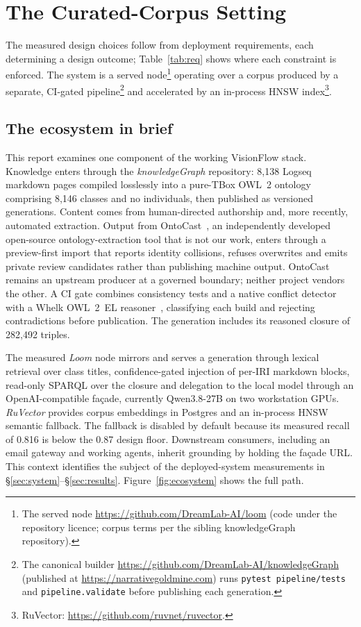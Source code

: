 \documentclass[10pt,twocolumn]{article}
\begin{document}
\section{The Curated-Corpus Setting}\label{sec:setting}
The measured design choices follow from deployment requirements, each determining a design outcome; Table~\ref{tab:req} shows where each constraint is enforced. The system is a served node\footnote{The served node \url{https://github.com/DreamLab-AI/loom} (code under the repository licence; corpus terms per the sibling knowledgeGraph repository).} operating over a corpus produced by a separate, CI-gated pipeline\footnote{The canonical builder \url{https://github.com/DreamLab-AI/knowledgeGraph} (published at \url{https://narrativegoldmine.com}) runs \texttt{pytest pipeline/tests} and \texttt{pipeline.validate} before publishing each generation.} and accelerated by an in-process HNSW index\footnote{RuVector: \url{https://github.com/ruvnet/ruvector}.}.

\subsection{The ecosystem in brief}\label{sec:ecosystem}
This report examines one component of the working VisionFlow stack. Knowledge enters through the \emph{knowledgeGraph} repository: 8{,}138 Logseq markdown pages compiled losslessly into a pure-TBox OWL~2 ontology comprising 8{,}146 classes and no individuals, then published as versioned generations. Content comes from human-directed authorship and, more recently, automated extraction. Output from OntoCast~\cite{ontocast}, an independently developed open-source ontology-extraction tool that is not our work, enters through a preview-first import that reports identity collisions, refuses overwrites and emits private review candidates rather than publishing machine output. OntoCast remains an upstream producer at a governed boundary; neither project vendors the other. A CI gate combines consistency tests and a native conflict detector with a Whelk OWL~2~EL reasoner~\cite{whelk}, classifying each build and rejecting contradictions before publication. The generation includes its reasoned closure of 282{,}492 triples.

The measured \emph{Loom} node mirrors and serves a generation through lexical retrieval over class titles, confidence-gated injection of per-IRI markdown blocks, read-only SPARQL over the closure and delegation to the local model through an OpenAI-compatible fa\c{c}ade, currently Qwen3.8-27B on two workstation GPUs. \emph{RuVector} provides corpus embeddings in Postgres and an in-process HNSW semantic fallback. The fallback is disabled by default because its measured recall of 0.816 is below the 0.87 design floor. Downstream consumers, including an email gateway and working agents, inherit grounding by holding the fa\c{c}ade URL. This context identifies the subject of the deployed-system measurements in \S\ref{sec:system}--\S\ref{sec:results}. Figure~\ref{fig:ecosystem} shows the full path.
\end{document}
